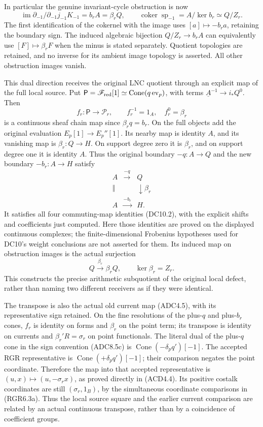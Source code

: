 In particular the genuine invariant-cycle obstruction is now \[
\boxed{\operatorname{im}\partial_{-1}/\partial_{-1}j_{-1}K_{-1}
=b_rA=\beta_rQ,\qquad
\operatorname{coker}\operatorname{sp}_{-1}
=A/\ker b_r\simeq Q/Z_r.}
\tag{ADC8.9}
\] The first identification of the cokernel with the image uses
\([a]\mapsto-b_ra\), retaining the boundary sign. The induced algebraic
bijection \(Q/Z_r\to b_rA\) can equivalently use \([F]\mapsto\beta_rF\)
when the minus is stated separately. Quotient topologies are retained,
and no inverse for its ambient image topology is asserted. All other
obstruction images vanish.

This dual direction receives the original LNC quotient through an
explicit map of the full local source. Put
\(\mathsf P=\mathscr F_{\rm red}[1]\simeq\operatorname{Cone}(q\,\mathrm{ev}_p)\),
with terms \(\underline A^{-1}\to i_*Q^0\). Then \[
f_r:\mathsf P\longrightarrow\mathscr P_r,\qquad
f_r^{-1}=1_A,\quad f_r^0=\beta_r
\tag{ADC8.10}
\] is a continuous sheaf chain map since \(\beta_rq=b_r\). On the full
objects add the original evaluation \(E_p[1]\to E_p''[1]\). Its nearby
map is identity \(A\), and its vanishing map is \(\beta_r:Q\to H\). On
support degree zero it is \(\beta_r\), and on support degree one it is
identity \(A\). Thus the original boundary \(-q:A\to Q\) and the new
boundary \(-b_r:A\to H\) satisfy \[
\begin{array}{ccc}
A&\xrightarrow{-q}&Q\\
\Vert&&\downarrow\beta_r\\
A&\xrightarrow{-b_r}&H .
\end{array}
\tag{ADC8.11}
\] It satisfies all four commuting-map identities (DC10.2), with the
explicit shifts and coefficients just computed. Here those identities
are proved on the displayed continuous complexes; the finite-dimensional
Frobenius hypotheses used for DC10's weight conclusions are not asserted
for them. Its induced map on obstruction images is the actual surjection
\[
Q\xrightarrow{\beta_r}\beta_rQ,\qquad
\ker\beta_r=Z_r.
\tag{ADC8.12}
\] This constructs the precise arithmetic subquotient of the original
local defect, rather than naming two different receivers as if they were
identical.

The transpose is also the actual old current map (ADC4.5), with its
representative sign retained. On the fine resolutions of the plus-\(q\)
and plus-\(b_r\) cones, \(f_r\) is identity on forms and \(\beta_r\) on
the point term; its transpose is identity on currents and
\(\beta_r'R=\sigma_r\) on point functionals. The literal dual of the
plus-\(q\) cone in the sign convention (ADC8.5c) is
\(\operatorname{Cone}(-\delta_pq')[-1]\). The accepted RGR
representative is \(\operatorname{Cone}(+\delta_pq')[-1]\); their
comparison negates the point coordinate. Therefore the map into that
accepted representative is \((u,x)\mapsto(u,-\sigma_rx)\), as proved
directly in (ACD4.4). Its positive costalk coordinates are still
\((\sigma_r,1_B)\), by the simultaneous coordinate comparisons in
(RGR6.3a). Thus the local source square and the earlier current
comparison are related by an actual continuous transpose, rather than by
a coincidence of coefficient groups.

